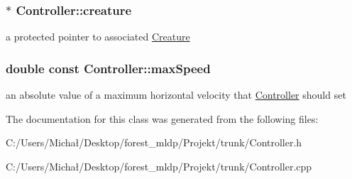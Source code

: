 \subsubsection[{\texorpdfstring{creature}{creature}}]{$\ast$ Controller\+::creature\hspace{0.3cm}{\ttfamily [protected]}}\hypertarget{class_controller_a54982a6e6ceaafdd59d72ddd7df013a1}{}\label{class_controller_a54982a6e6ceaafdd59d72ddd7df013a1}
a protected pointer to associated \hyperlink{class_creature}{Creature} 
\subsubsection[{\texorpdfstring{max\+Speed}{maxSpeed}}]{\setlength{\rightskip}{0pt plus 5cm}double const Controller\+::max\+Speed\hspace{0.3cm}{\ttfamily [protected]}}\hypertarget{class_controller_ac16d67602af82582f06ffeaf35fa9337}{}\label{class_controller_ac16d67602af82582f06ffeaf35fa9337}
an absolute value of a maximum horizontal velocity that \hyperlink{class_controller}{Controller} should set 

The documentation for this class was generated from the following files\+:\begin{DoxyCompactItemize}
\item 
C\+:/\+Users/\+Michał/\+Desktop/forest\+\_\+mldp/\+Projekt/trunk/Controller.\+h\item 
C\+:/\+Users/\+Michał/\+Desktop/forest\+\_\+mldp/\+Projekt/trunk/Controller.\+cpp\end{DoxyCompactItemize}

